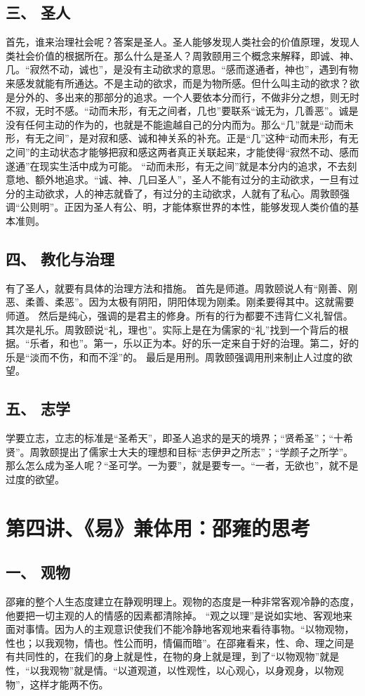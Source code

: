 \documentclass{article}
\begin{document}
\subsection{三、	圣人}
首先，谁来治理社会呢？答案是圣人。圣人能够发现人类社会的价值原理，发现人类社会价值的根据所在。那么什么是圣人？周敦颐用三个概念来解释，即诚、神、几。“寂然不动，诚也”，是没有主动欲求的意思。“感而遂通者，神也”，遇到有物来感发就能有所通达。不是主动的欲求，而是为物所感。但什么叫主动的欲求？欲是分外的、多出来的那部分的追求。一个人要依本分而行，不做非分之想，则无时不寂，无时不感。“动而未形，有无之间者，几也”要联系“诚无为，几善恶”。诚是没有任何主动的作为的，也就是不能逾越自己的分内而为。那么“几”就是“动而未形，有无之间”，是对寂和感、诚和神关系的补充。正是“几”这种“动而未形，有无之间”的主动状态才能够把寂和感这两者真正关联起来，才能使得“寂然不动、感而遂通”在现实生活中成为可能。
“动而未形，有无之间”就是本分内的追求，不去刻意地、额外地追求。“诚、神、几曰圣人”，圣人不能有过分的主动欲求，一旦有过分的主动欲求，人的神志就昏了，有过分的主动欲求，人就有了私心。周敦颐强调“公则明”。正因为圣人有公、明，才能体察世界的本性，能够发现人类价值的基本准则。
\subsection{四、	教化与治理}
有了圣人，就要有具体的治理方法和措施。
首先是师道。周敦颐说人有“刚善、刚恶、柔善、柔恶”。因为太极有阴阳，阴阳体现为刚柔。刚柔要得其中。这就需要师道。
然后是纯心，强调的是君主的修身。所有的行为都要不违背仁义礼智信。
其次是礼乐。周敦颐说“礼，理也”。实际上是在为儒家的“礼”找到一个背后的根据。“乐者，和也”。第一，乐以正为本。好的乐一定来自于好的治理。第二，好的乐是“淡而不伤，和而不淫”的。
最后是用刑。周敦颐强调用刑来制止人过度的欲望。
\subsection{五、	志学}
学要立志，立志的标准是“圣希天”，即圣人追求的是天的境界；“贤希圣”；“十希贤”。周敦颐提出了儒家士大夫的理想和目标“志伊尹之所志”；“学颜子之所学”。那么怎么成为圣人呢？“圣可学。一为要”，就是要专一。“一者，无欲也”，就不是过度的欲望。

\section{第四讲、《易》兼体用：邵雍的思考}
\subsection{一、	观物}
邵雍的整个人生态度建立在静观明理上。观物的态度是一种非常客观冷静的态度，他要把一切主观的人的情感的因素都清除掉。
“观之以理”是说如实地、客观地来面对事情。因为人的主观意识使我们不能冷静地客观地来看待事物。“以物观物，性也；以我观物，情也。性公而明，情偏而暗”。在邵雍看来，性、命、理之间是有共同性的，在我们的身上就是性，在物的身上就是理，到了“以物观物”就是性，“以我观物”就是情。“以道观道，以性观性，以心观心，以身观身，以物观物”，这样才能两不伤。
\end{document}
